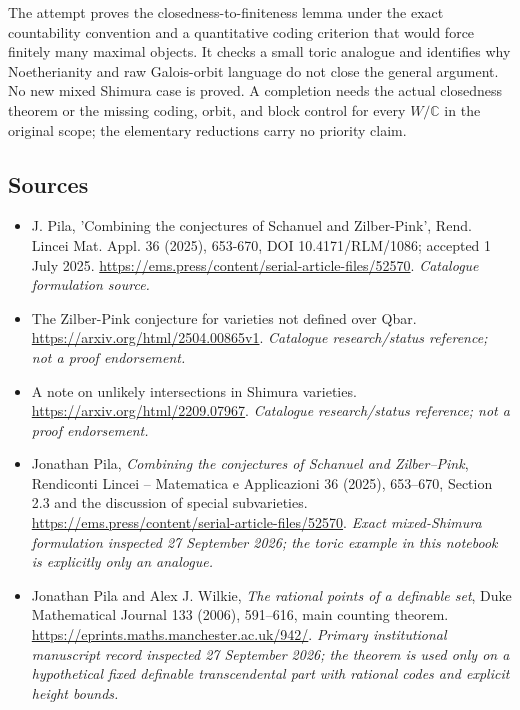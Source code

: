 \documentclass[11pt,a4paper]{article}
\numberwithin{equation}{section}
\newcommand{\C}{\mathbb{C}}
\begin{document}
The attempt proves the closedness-to-finiteness lemma under the exact
countability convention and a quantitative coding criterion that would
force finitely many maximal objects. It checks a small toric analogue and
identifies why Noetherianity and raw Galois-orbit language do not close the
general argument. No new mixed Shimura case is proved. A completion needs
the actual closedness theorem or the missing coding, orbit, and block
control for every $W/\C$ in the original scope; the elementary reductions
carry no priority claim.
\subsection{Sources}
\begin{itemize}\raggedright
\item[\textnormal{[S1]}]\hypertarget{source:statement:1}{} J. Pila, 'Combining the conjectures of Schanuel and Zilber-Pink', Rend. Lincei Mat. Appl. 36 (2025), 653-670, DOI 10.4171/RLM/1086; accepted 1 July 2025.
\url{https://ems.press/content/serial-article-files/52570}.
{\small\textit{Catalogue formulation source.}}
\item[\textnormal{[S2]}]\hypertarget{source:statement:2}{} The Zilber-Pink conjecture for varieties not defined over Qbar.
\url{https://arxiv.org/html/2504.00865v1}.
{\small\textit{Catalogue research/status reference; not a proof endorsement.}}
\item[\textnormal{[S3]}]\hypertarget{source:statement:3}{} A note on unlikely intersections in Shimura varieties.
\url{https://arxiv.org/html/2209.07967}.
{\small\textit{Catalogue research/status reference; not a proof endorsement.}}
\item[\textnormal{[E1]}]\hypertarget{extra:statement:1}{} Jonathan Pila,
\emph{Combining the conjectures of Schanuel and Zilber--Pink},
Rendiconti Lincei -- Matematica e Applicazioni 36 (2025), 653--670,
Section 2.3 and the discussion of special subvarieties.
\url{https://ems.press/content/serial-article-files/52570}.
{\small\textit{Exact mixed-Shimura formulation inspected 27 September 2026;
the toric example in this notebook is explicitly only an analogue.}}
\item[\textnormal{[E2]}]\hypertarget{extra:statement:2}{} Jonathan Pila and
Alex J. Wilkie, \emph{The rational points of a definable set},
Duke Mathematical Journal 133 (2006), 591--616, main counting theorem.
\url{https://eprints.maths.manchester.ac.uk/942/}.
{\small\textit{Primary institutional manuscript record inspected
27 September 2026; the theorem is used only on a hypothetical fixed
definable transcendental part with rational codes and explicit height bounds.}}
\end{itemize}
\end{document}
